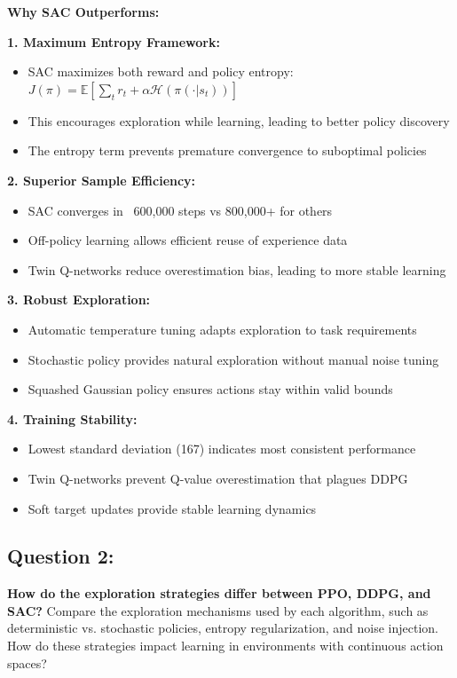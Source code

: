 \documentclass[12pt]{article}
\begin{document}
{{{\textbf{Why SAC Outperforms:}

\textbf{1. Maximum Entropy Framework:}
\begin{itemize}
    \item SAC maximizes both reward and policy entropy: $J(\pi) = \mathbb{E}[\sum_t r_t + \alpha \mathcal{H}(\pi(\cdot|s_t))]$
    \item This encourages exploration while learning, leading to better policy discovery
    \item The entropy term prevents premature convergence to suboptimal policies
\end{itemize}

\textbf{2. Superior Sample Efficiency:}
\begin{itemize}
    \item SAC converges in ~600,000 steps vs 800,000+ for others
    \item Off-policy learning allows efficient reuse of experience data
    \item Twin Q-networks reduce overestimation bias, leading to more stable learning
\end{itemize}

\textbf{3. Robust Exploration:}
\begin{itemize}
    \item Automatic temperature tuning adapts exploration to task requirements
    \item Stochastic policy provides natural exploration without manual noise tuning
    \item Squashed Gaussian policy ensures actions stay within valid bounds
\end{itemize}

\textbf{4. Training Stability:}
\begin{itemize}
    \item Lowest standard deviation (167) indicates most consistent performance
    \item Twin Q-networks prevent Q-value overestimation that plagues DDPG
    \item Soft target updates provide stable learning dynamics
\end{itemize}

\subsection{Question 2:}
\textbf{How do the exploration strategies differ between PPO, DDPG, and SAC?}
\newline
Compare the exploration mechanisms used by each algorithm, such as deterministic vs. stochastic policies, entropy regularization, and noise injection. How do these strategies impact learning in environments with continuous action spaces?

}}}
\end{document}
